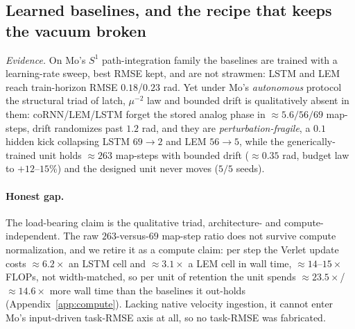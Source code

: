 \documentclass{article}
\begin{document}
\subsection{Learned baselines, and the recipe that keeps the vacuum broken}\label{sec:baselines}

\emph{Evidence.} On Mo's $S^1$ path-integration family the baselines are trained with a learning-rate sweep, best RMSE kept, and are not strawmen: LSTM and LEM reach train-horizon RMSE $0.18$/$0.23$ rad. Yet under Mo's \emph{autonomous} protocol the structural triad of latch, $\mu^{-2}$ law and bounded drift is qualitatively absent in them: coRNN/LEM/LSTM forget the stored analog phase in $\approx5.6/56/69$ map-steps, drift randomizes past $1.2$ rad, and they are \emph{perturbation-fragile}, a $0.1$ hidden kick collapsing LSTM $69\to2$ and LEM $56\to5$, while the generically-trained unit holds $\approx263$ map-steps with bounded drift ($\approx0.35$ rad, budget law to $+12$--$15\%$) and the designed unit never moves ($5/5$ seeds).

\paragraph{Honest gap.} The load-bearing claim is the qualitative triad, architecture- and compute-independent. The raw $263$-versus-$69$ map-step ratio does not survive compute normalization, and we retire it as a compute claim: per step the Verlet update costs $\approx6.2\times$ an LSTM cell and $\approx3.1\times$ a LEM cell in wall time, $\approx14$--$15\times$ FLOPs, not width-matched, so per unit of retention the unit spends $\approx23.5\times$/$\approx14.6\times$ more wall time than the baselines it out-holds (Appendix~\ref{app:compute}). Lacking native velocity ingestion, it cannot enter Mo's input-driven task-RMSE axis at all, so no task-RMSE was fabricated.
\end{document}
